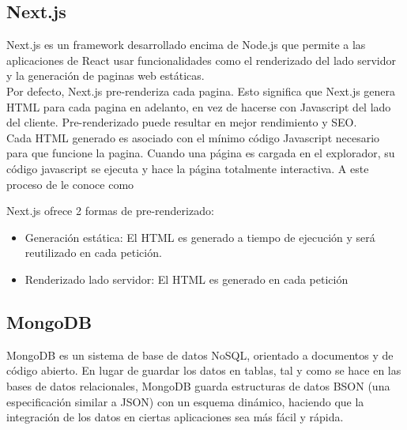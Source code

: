     \subsection{Next.js}

        Next.js es un framework desarrollado encima de Node.js que permite a las aplicaciones de React usar funcionalidades como el renderizado del lado servidor y la generación de paginas web estáticas.\\

        Por defecto, Next.js pre-renderiza cada pagina. Esto significa que Next.js genera HTML para cada pagina en adelanto, en vez de hacerse con Javascript del lado del cliente. Pre-renderizado puede resultar en mejor rendimiento y SEO.\\

        Cada HTML generado es asociado con el mínimo código Javascript necesario para que funcione la pagina. Cuando una página es cargada en el explorador, su código javascript se ejecuta y hace la página totalmente interactiva. A este proceso de le conoce como 

        Next.js ofrece 2 formas de pre-renderizado: 

        \begin{itemize}
            \item Generación estática: El HTML es generado a tiempo de ejecución y será reutilizado en cada petición.
            \item Renderizado lado servidor: El HTML es generado en cada petición
        \end{itemize}

    \subsection{MongoDB}

        MongoDB es un sistema de base de datos NoSQL, orientado a documentos y de código abierto. En lugar de guardar los datos en tablas, tal y como se hace en las bases de datos relacionales, MongoDB guarda estructuras de datos BSON (una especificación similar a JSON) con un esquema dinámico, haciendo que la integración de los datos en ciertas aplicaciones sea más fácil y rápida.

        \iffalse 
            \begin{figure}
                \texttt{[image: mongodb-structure.jpg]}
                \caption{Comparación de estructura de datos entre MongoDB y los RDBMS (sistema de gestión de bases de datos relacionales)}
            \end{figure}
        \fi


